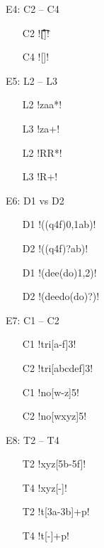 E4: C2 -- C4
\vspace{-5mm}
\begin{multicols}{1}
\begin{itemize}[noitemsep,topsep=0pt]
\item[C2] \cverb![\t\r\f\n ]!
\item[C4] \cverb![\s]!
\end{itemize}
\end{multicols}
\vspace{5mm}

E5: L2 -- L3
\vspace{-5mm}
\begin{multicols}{2}
\begin{itemize}[noitemsep,topsep=0pt]
\item[L2] \cverb!zaa*!
\item[L3] \cverb!za+!
\item[L2] \cverb!RR*!
\item[L3] \cverb!R+!
\end{itemize}
\end{multicols}
\vspace{5mm}

E6: D1 vs D2
\vspace{-5mm}
\begin{multicols}{2}
\begin{itemize}[noitemsep,topsep=0pt]
\item[D1] \cverb!((q4f){0,1}ab)!
\item[D2] \cverb!((q4f)?ab)!
\item[D1] \cverb!(dee(do){1,2})!
\item[D2] \cverb!(deedo(do)?)!
\end{itemize}
\end{multicols}
\vspace{5mm}

E7: C1 -- C2
\vspace{-5mm}
\begin{multicols}{2}
\begin{itemize}[noitemsep,topsep=0pt]
\item[C1] \cverb!tri[a-f]3!
\item[C2] \cverb!tri[abcdef]3!
\item[C1] \cverb!no[w-z]5!
\item[C2] \cverb!no[wxyz]5!
\end{itemize}
\end{multicols}
\vspace{5mm}

E8: T2 -- T4
\vspace{-5mm}
\begin{multicols}{2}
\begin{itemize}[noitemsep,topsep=0pt]
\item[T2] \cverb!xyz[\x5b-\x5f]!
\item[T4] \cverb!xyz[-]!
\item[T2] \cverb!t[\x3a-\x3b]+p!
\item[T4] \cverb!t[-]+p!
\end{itemize}
\end{multicols}
\vspace{5mm}

